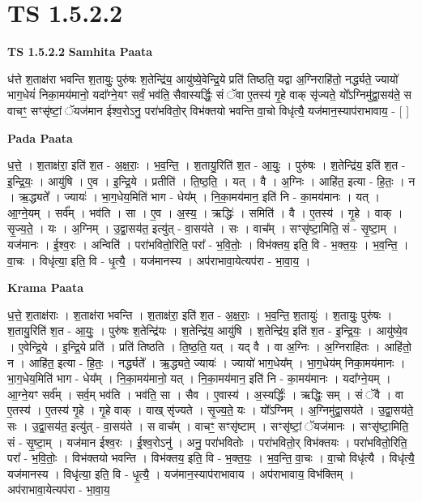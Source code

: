 \documentclass[17pt]{extarticle}
\begin{document}
\section{ TS 1.5.2.2 }

\textbf{TS 1.5.2.2 } \newline
\textbf{Samhita Paata} \newline

ध॑त्ते श॒ताक्ष॑रा भवन्ति श॒तायुः॒ पुरु॑षः श॒तेन्द्रि॑य॒ आयु॑ष्ये॒वेन्द्रि॒ये प्रति॑ तिष्ठति॒ यद्वा अ॒ग्निराहि॑तो॒ नर्द्ध्यते॒ ज्यायो॑ भाग॒धेयं॑ निका॒मय॑मानो॒ यदा᳚ग्ने॒यꣳ सर्वं॒ भव॑ति॒ सैवास्यर्द्धिः॒ सं ॅवा ए॒तस्य॑ गृ॒हे वाक् सृ॑ज्यते॒ यो᳚ऽग्निमु॑द्वा॒सय॑ते॒ स वाचꣳ॒॒ सꣳसृ॑ष्टां॒ ॅयज॑मान ईश्व॒रोऽनु॒ परा॑भवितो॒र् विभ॑क्तयो भवन्ति वा॒चो विधृ॑त्यै॒ यज॑मान॒स्याप॑राभावाय॒ - [ ] \newline

\textbf{Pada Paata} \newline

ध॒त्ते॒ । श॒ताक्ष॑रा॒ इति॑ श॒त - अ॒क्ष॒राः॒ । भ॒व॒न्ति॒ । श॒तायु॒रिति॑ श॒त - आ॒युः॒ । पुरु॑षः । श॒तेन्द्रि॑य॒ इति॑ श॒त - इ॒न्द्रि॒यः॒ । आयु॑षि । ए॒व । इ॒न्द्रि॒ये । प्रतीति॑ । ति॒ष्ठ॒ति॒ । यत् । वै । अ॒ग्निः । आहि॑त॒ इत्या - हि॒तः॒ । न । ऋ॒द्ध्यते᳚ । ज्यायः॑ । भा॒ग॒धेय॒मिति॑ भाग - धेय᳚म् । नि॒का॒मय॑मान॒ इति॑ नि - का॒मय॑मानः । यत् । आ॒ग्ने॒यम् । सर्व᳚म् । भव॑ति । सा । ए॒व । अ॒स्य॒ । ऋद्धिः॑ । समिति॑ । वै । ए॒तस्य॑ । गृ॒हे । वाक् । सृ॒ज्य॒ते॒ । यः । अ॒ग्निम् । उ॒द्वा॒सय॑त॒ इत्यु॑त् - वा॒सय॑ते । सः । वाच᳚म् । सꣳसृ॑ष्टा॒मिति॒ सं - सृ॒ष्टा॒म् । यज॑मानः । ई॒श्व॒रः । अन्विति॑ । परा॑भवितो॒रिति॒ परा᳚ - भ॒वि॒तोः॒ । विभ॑क्तय॒ इति॒ वि - भ॒क्त॒यः॒ । भ॒व॒न्ति॒ । वा॒चः । विधृ॑त्या॒ इति॒ वि - धृ॒त्यै॒ । यज॑मानस्य । अप॑राभावा॒येत्यप॑रा - भा॒वा॒य॒ ।  \newline


\textbf{Krama Paata} \newline

ध॒त्ते॒ श॒ताक्ष॑राः । श॒ताक्ष॑रा भवन्ति । श॒ताक्ष॑रा॒ इति॑ श॒त - अ॒क्ष॒राः॒ । भ॒व॒न्ति॒ श॒तायुः॑ । श॒तायुः॒ पुरु॑षः । श॒तायु॒रिति॑ श॒त - आ॒युः॒ । पुरु॑षः श॒तेन्द्रि॑यः । श॒तेन्द्रि॑य॒ आयु॑षि । श॒तेन्द्रि॑य॒ इति॑ श॒त - इ॒न्द्रि॒यः॒ । आयु॑ष्ये॒व । ए॒वेन्द्रि॒ये । इ॒न्द्रि॒ये प्रति॑ । प्रति॑ तिष्ठति । ति॒ष्ठ॒ति॒ यत् । यद् वै । वा अ॒ग्निः । अ॒ग्निराहि॑तः । आहि॑तो॒ न । आहि॑त॒ इत्या - हि॒तः॒ । नर्द्ध्यते᳚ । ऋ॒द्ध्यते॒ ज्यायः॑ । ज्यायो॑ भाग॒धेय᳚म् । भा॒ग॒धेय॑म् निका॒मय॑मानः । भा॒ग॒धेय॒मिति॑ भाग - धेय᳚म् । नि॒का॒मय॑मानो॒ यत् । नि॒का॒मय॑मान॒ इति॑ नि - का॒मय॑मानः । यदा᳚ग्ने॒यम् । आ॒ग्ने॒यꣳ सर्व᳚म् । सर्व॒म् भव॑ति । भव॑ति॒ सा । सैव । ए॒वास्य॑ । अ॒स्यर्द्धिः॑ । ऋद्धिः॒ सम् । सं ॅवै । वा ए॒तस्य॑ । ए॒तस्य॑ गृ॒हे । गृ॒हे वाक् । वाख् सृ॑ज्यते । सृ॒ज्य॒ते॒ यः । यो᳚ऽग्निम् । अ॒ग्निमु॑द्वा॒सय॑ते । उ॒द्वा॒सय॑ते॒ सः । उ॒द्वा॒सय॑त॒ इत्यु॑त् - वा॒सय॑ते । स वाच᳚म् । वाचꣳ॒॒ सꣳसृ॑ष्टाम् । सꣳसृ॑ष्टां॒ ॅयज॑मानः । सꣳसृ॑ष्टा॒मिति॒ सं - सृ॒ष्टा॒म् । यज॑मान ईश्व॒रः । ई॒श्व॒रोऽनु॑ । अनु॒ परा॑भवितोः । परा॑भवितो॒र् विभ॑क्तयः । परा॑भवितो॒रिति॒ परा᳚ - भ॒वि॒तोः॒ । विभ॑क्तयो भवन्ति । विभ॑क्तय॒ इति॒ वि - भ॒क्त॒यः॒ । भ॒व॒न्ति॒ वा॒चः । वा॒चो विधृ॑त्यै । विधृ॑त्यै॒ यज॑मानस्य । विधृ॑त्या॒ इति॒ वि - धृ॒त्यै॒ । यज॑मान॒स्याप॑राभावाय । अप॑राभावाय॒ विभ॑क्तिम् । अप॑राभावा॒येत्यप॑रा - भा॒वा॒य॒ \newline
\end{document}

